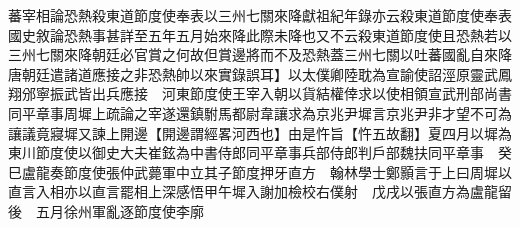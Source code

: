 蕃宰相論恐熱殺東道節度使奉表以三州七關來降獻祖紀年錄亦云殺東道節度使奉表國史敘論恐熱事甚詳至五年五月始來降此際未降也又不云殺東道節度使且恐熱若以三州七關來降朝廷必官賞之何故但賞邊將而不及恐熱蓋三州七關以吐蕃國亂自來降唐朝廷遣諸道應接之非恐熱帥以來實錄誤耳】以太僕卿陸耽為宣諭使詔涇原靈武鳳翔邠寧振武皆出兵應接　河東節度使王宰入朝以貨結權倖求以使相領宣武刑部尚書同平章事周墀上疏論之宰遂還鎮駙馬都尉韋讓求為京兆尹墀言京兆尹非才望不可為讓議竟寢墀又諫上開邊【開邊謂經畧河西也】由是忤旨【忤五故翻】夏四月以墀為東川節度使以御史大夫崔鉉為中書侍郎同平章事兵部侍郎判戶部魏扶同平章事　癸巳盧龍奏節度使張仲武薨軍中立其子節度押牙直方　翰林學士鄭顥言于上曰周墀以直言入相亦以直言罷相上深感悟甲午墀入謝加檢校右僕射　戊戌以張直方為盧龍留後　五月徐州軍亂逐節度使李廓